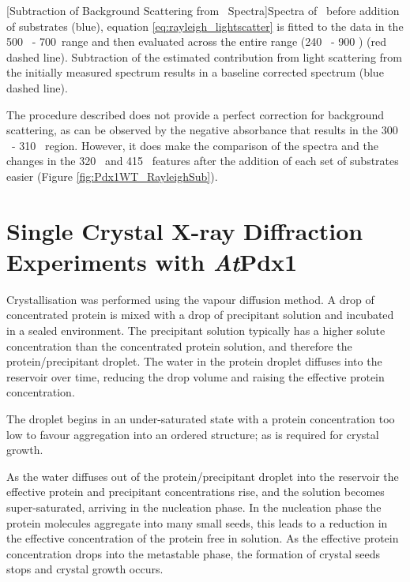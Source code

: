 \begin{minipage}{\linewidth}

	[Subtraction of Background Scattering from \atpdx ~Spectra]{Spectra of \atpdx ~before addition of substrates (blue), equation \ref{eq:rayleigh_lightscatter} is fitted to the data in the 500 \nm ~- 700\nm ~range and then evaluated across the entire range (240 \nm ~- 900 \nm ) (red dashed line). Subtraction of the estimated contribution from light scattering from the initially measured spectrum results in a baseline corrected spectrum (blue dashed line).\label{fig:RayleighSub_demo}}	
\end{minipage}

The procedure described does not provide a perfect correction for background scattering, as can be observed by the negative absorbance that results in the 300 \nm ~- 310 \nm ~region. However, it does make the comparison of the spectra and the changes in the 320 \nm ~and 415 \nm ~features after the addition of each set of substrates easier (Figure \ref{fig:Pdx1WT_RayleighSub}).
		
		\newpage
	\section{Single Crystal X-ray Diffraction Experiments with \textit{At}Pdx1}
	\label{sec:Crystallisation_Methods}
	Crystallisation was performed using the vapour diffusion method. A drop of concentrated protein is mixed with a drop of precipitant solution and incubated in a sealed environment. The precipitant solution typically has a higher solute concentration than the concentrated protein solution, and therefore the protein/precipitant droplet. The water in the protein droplet diffuses into the reservoir over time, reducing the drop volume and raising the effective protein concentration.  \par
	The droplet begins in an under-saturated state with a protein concentration too low to favour aggregation into an ordered structure; as is required for crystal growth.

As the water diffuses out of the protein/precipitant droplet into the reservoir the effective protein and precipitant concentrations rise, and the solution becomes super-saturated, arriving in the nucleation phase. In the nucleation phase the protein molecules aggregate into many small seeds, this leads to a reduction in the effective concentration of the protein free in solution. As the effective protein concentration drops into the metastable phase, the formation of crystal seeds stops and crystal growth occurs.
 

